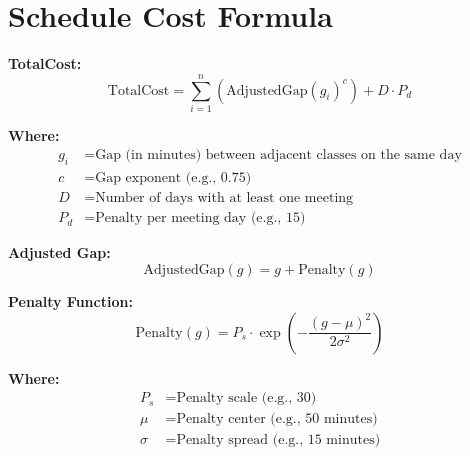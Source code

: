 \documentclass{article}
\begin{document}
\section*{Schedule Cost Formula}

\textbf{TotalCost:}
\[
\text{TotalCost} = \sum_{i=1}^{n} \left( \text{AdjustedGap}(g_i)^{c} \right) + D \cdot P_d
\]

\textbf{Where:}
\begin{align*}
g_i & = \text{Gap (in minutes) between adjacent classes on the same day} \\
c & = \text{Gap exponent (e.g., 0.75)} \\
D & = \text{Number of days with at least one meeting} \\
P_d & = \text{Penalty per meeting day (e.g., 15)}
\end{align*}

\vspace{1em}
\textbf{Adjusted Gap:}
\[
\text{AdjustedGap}(g) = g + \text{Penalty}(g)
\]

\textbf{Penalty Function:}
\[
\text{Penalty}(g) = P_s \cdot \exp\left( -\frac{(g - \mu)^2}{2\sigma^2} \right)
\]

\textbf{Where:}
\begin{align*}
P_s & = \text{Penalty scale (e.g., 30)} \\
\mu & = \text{Penalty center (e.g., 50 minutes)} \\
\sigma & = \text{Penalty spread (e.g., 15 minutes)}
\end{align*}
\end{document}
